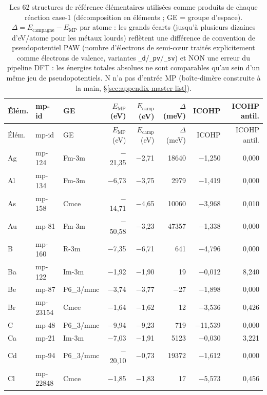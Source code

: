 \begin{longtable}{@{}ll l@{\hspace{4pt}} rrrrr@{}}
\caption{Les 62 structures de référence élémentaires utilisées comme produits de chaque réaction case-1 (décomposition en éléments ; GE = groupe d'espace). $\Delta = E_\text{campagne} - E_\text{MP}$ par atome : les grands écarts (jusqu'à plusieurs dizaines d'eV/atome pour les métaux lourds) reflètent une différence de convention de pseudopotentiel PAW (nombre d'électrons de semi-c\oe{}ur trait\'es explicitement comme \'electrons de valence, variantes \texttt{\_d}/\texttt{\_pv}/\texttt{\_sv}) et NON une erreur du pipeline DFT : les \'energies totales absolues ne sont comparables qu'au sein d'un m\^eme jeu de pseudopotentiels. N n'a pas d'entr\'ee MP (bo\^ite-dim\`ere construite \`a la main, \S\ref{sec:appendix-master-list}).}\\
\toprule
Élém. & mp-id & GE & $E_\text{MP}$ (eV) & $E_\text{camp}$ (eV) & $\Delta$ (meV) & ICOHP & ICOHP antil. \\
\midrule
\endfirsthead
\toprule
Élém. & mp-id & GE & $E_\text{MP}$ (eV) & $E_\text{camp}$ (eV) & $\Delta$ (meV) & ICOHP & ICOHP antil. \\
\midrule
\endhead
\bottomrule
\endfoot
\bottomrule
\endlastfoot
Ag & mp-124 & Fm-3m & $-$21{,}35 & $-$2{,}71 & 18640 & $-$1{,}250 & 0{,}000 \\
Al & mp-134 & Fm-3m & $-$6{,}73 & $-$3{,}75 & 2979 & $-$1{,}419 & 0{,}000 \\
As & mp-158 & Cmce & $-$14{,}71 & $-$4{,}65 & 10060 & $-$3{,}968 & 0{,}010 \\
Au & mp-81 & Fm-3m & $-$50{,}58 & $-$3{,}23 & 47357 & $-$1{,}338 & 0{,}000 \\
B & mp-160 & R-3m & $-$7{,}35 & $-$6{,}71 & 641 & $-$4{,}796 & 0{,}000 \\
Ba & mp-122 & Im-3m & $-$1{,}92 & $-$1{,}90 & 19 & $-$0{,}012 & 8{,}240 \\
Be & mp-87 & P6_3/mmc & $-$3{,}74 & $-$3{,}77 & $-$27 & $-$1{,}898 & 0{,}000 \\
Br & mp-23154 & Cmce & $-$1{,}64 & $-$1{,}62 & 12 & $-$3{,}536 & 0{,}426 \\
C & mp-48 & P6_3/mmc & $-$9{,}94 & $-$9{,}23 & 719 & $-$11{,}539 & 0{,}000 \\
Ca & mp-21 & Im-3m & $-$7{,}03 & $-$1{,}91 & 5123 & $-$0{,}030 & 3{,}221 \\
Cd & mp-94 & P6_3/mmc & $-$20{,}10 & $-$0{,}73 & 19372 & $-$1{,}612 & 0{,}000 \\
Cl & mp-22848 & Cmce & $-$1{,}85 & $-$1{,}83 & 17 & $-$5{,}573 & 0{,}456 \\

\end{longtable}
